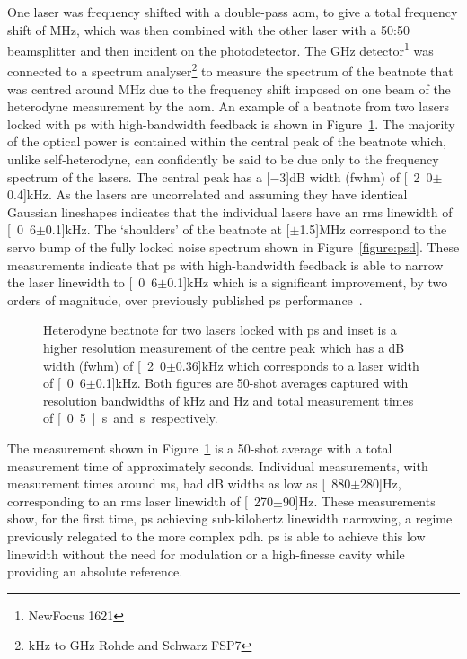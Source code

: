 One laser was frequency shifted with a double-pass \gls{aom}, to give a total frequency shift of \unit[160]{MHz}, which was then combined with the other laser with a 50:50 beamsplitter and then incident on the photodetector.
The \unit[1]{GHz} detector\footnote{NewFocus 1621} was connected to a spectrum analyser\footnote{\unit[9]{kHz} to \unit[7]{GHz} Rohde and Schwarz FSP7} to measure the spectrum of the beatnote that was centred around \unit[160]{MHz} due to the frequency shift imposed on one beam of the heterodyne measurement by the \gls{aom}.
An example of a beatnote from two lasers locked with \gls{ps} with high-bandwidth feedback is shown in Figure~\ref{figure:two_laser_beatnote}.
The majority of the optical power is contained within the central peak of the beatnote which, unlike self-heterodyne, can confidently be said to be due only to the frequency spectrum of the lasers.
The central peak has a \unit[$-3$]{dB} width (\gls{fwhm}) of \unit[2.0$\pm$0.4]{kHz}.
As the lasers are uncorrelated and assuming they have identical Gaussian lineshapes indicates that the individual lasers have an \gls{rms} linewidth of \unit[0.6$\pm$0.1]{kHz}.
The `shoulders' of the beatnote at \unit[$\pm$1.5]{MHz} correspond to the servo bump of the fully locked noise spectrum shown in Figure~\ref{figure:psd}.
These measurements indicate that \gls{ps} with high-bandwidth feedback is able to narrow the laser linewidth to \unit[0.6$\pm$0.1]{kHz} which is a significant improvement, by two orders of magnitude, over previously published \gls{ps} performance~\cite{torii_laser-phase_2012}.

\begin{figure}
\center

\caption[Heterodyne beatnote for two external cavity diode lasers locked with high-bandwidth polarisation spectroscopy.]{Heterodyne beatnote for two lasers locked with \gls{ps} and inset is a higher resolution measurement of the centre peak which has a \unit[-3]{dB} width (\gls{fwhm}) of \unit[2.0$\pm$0.36]{kHz} which corresponds to a laser width of \unit[0.6$\pm$0.1]{kHz}.
Both figures are 50-shot averages captured with resolution bandwidths of \unit[30]{kHz} and \unit[100]{Hz} and total measurement times of \unit[0.5]{s} and \unit[2]{s} respectively.}
\label{figure:two_laser_beatnote}
\end{figure}

The measurement shown in Figure~\ref{figure:two_laser_beatnote} is a 50-shot average with a total measurement time of approximately \unit[2]{seconds}.
Individual measurements, with measurement times around \unit[40]{ms}, had \unit[-3]{dB} widths as low as \unit[880$\pm$280]{Hz}, corresponding to an \gls{rms} laser linewidth of \unit[270$\pm$90]{Hz}.
These measurements show, for the first time, \gls{ps} achieving sub-kilohertz linewidth narrowing, a regime previously relegated to the more complex \gls{pdh}.
\Gls{ps} is able to achieve this low linewidth without the need for modulation or a high-finesse cavity while providing an absolute reference.

